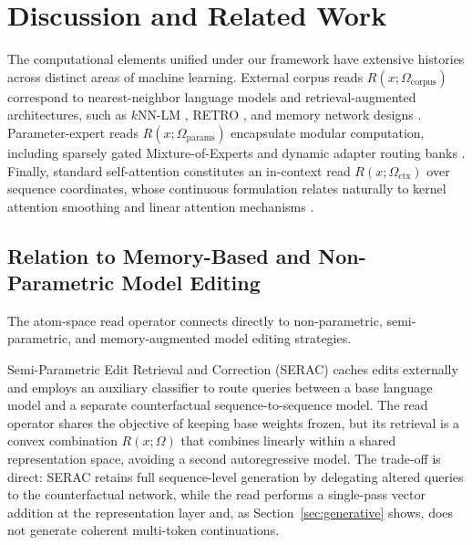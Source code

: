 \documentclass[preprint,12pt]{elsarticle}
\newcommand{\Om}{\Omega}
\begin{document}
\section{Discussion and Related Work}
\label{sec:discussion}

The computational elements unified under our framework have extensive histories across distinct areas of machine learning. External corpus reads $R(x; \Om_{\mathrm{corpus}})$ correspond to nearest-neighbor language models and retrieval-augmented architectures, such as $k$NN-LM \cite{khandelwal2020generalization, he2021efficient}, RETRO \cite{borgeaud2022improving}, and memory network designs \cite{sukhbaatar2015end, lample2019large}. Parameter-expert reads $R(x; \Om_{\mathrm{params}})$ encapsulate modular computation, including sparsely gated Mixture-of-Experts \cite{shazeer2017outrageously, fedus2022switch, jiang2024mixtral} and dynamic adapter routing banks \cite{hu2021lora}. Finally, standard self-attention \cite{vaswani2017attention} constitutes an in-context read $R(x; \Om_{\mathrm{ctx}})$ over sequence coordinates, whose continuous formulation relates naturally to kernel attention smoothing and linear attention mechanisms \cite{tsai2019transformer, katharopoulos2020transformers}.

\subsection{Relation to Memory-Based and Non-Parametric Model Editing}
The atom-space read operator connects directly to non-parametric, semi-parametric, and memory-augmented model editing strategies.

Semi-Parametric Edit Retrieval and Correction (SERAC) \cite{mitchell2022memory} caches edits externally and employs an auxiliary classifier to route queries between a base language model and a separate counterfactual sequence-to-sequence model. The read operator shares the objective of keeping base weights frozen, but its retrieval is a convex combination $R(x; \Om)$ that combines linearly within a shared representation space, avoiding a second autoregressive model. The trade-off is direct: SERAC retains full sequence-level generation by delegating altered queries to the counterfactual network, while the read performs a single-pass vector addition at the representation layer and, as Section~\ref{sec:generative} shows, does not generate coherent multi-token continuations.
\end{document}
